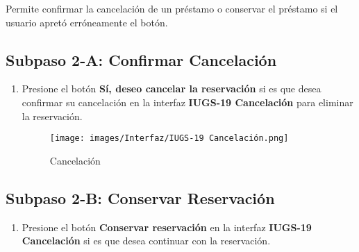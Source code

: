 Permite confirmar la cancelación de un préstamo o conservar el préstamo si el usuario apretó
erróneamente el botón.

\subsection{Subpaso 2-A: Confirmar Cancelación}
\begin{enumerate}
	\item Presione el botón \textbf{Sí, deseo cancelar la reservación} si es que desea confirmar
  su cancelación en la interfaz \textbf{IUGS-19 Cancelación} para eliminar la reservación.
  \begin{figure}[hbtp]
	\texttt{[image: images/Interfaz/IUGS-19 Cancelación.png]}
	\caption{Cancelación}
	\end{figure}
\end{enumerate}

\subsection{Subpaso 2-B: Conservar Reservación}
\begin{enumerate}
	\item Presione el botón \textbf{Conservar reservación} en la interfaz
    \textbf{IUGS-19 Cancelación} si es que desea continuar con la reservación.
\end{enumerate}
